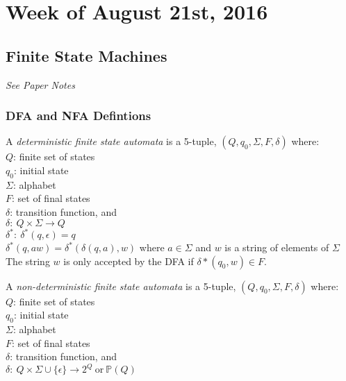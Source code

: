 \documentclass{article}
\begin{document}
\section{Week of August 21st, 2016}
\subsection{Finite State Machines}
\textit{See Paper Notes}

\subsubsection{DFA and NFA Defintions}
\begin{defn}
A \textit{deterministic finite state automata} is a 5-tuple, $(Q,q_0,\Sigma,F,\delta)$ where: \\
$Q$: finite set of states \\
$q_0$: initial state \\
$\Sigma$: alphabet \\
$F$: set of final states \\
$\delta$: transition function, and \\
$\delta:\ Q\times\Sigma\longrightarrow Q$ \\
$\delta^*:\ \delta^*(q,\epsilon)=q$ \\
$\delta^*(q,aw)=\delta^*(\delta(q,a),w)$ where $a\in\Sigma$ and $w$ is a string of elements of $\Sigma$ \\
The string $w$ is only accepted by the DFA if $\delta*(q_0,w)\in F$.
\end{defn}

\begin{defn}
A \textit{non-deterministic finite state automata} is a 5-tuple, $(Q,q_0,\Sigma,F,\delta)$ where: \\
$Q$: finite set of states \\
$q_0$: initial state \\
$\Sigma$: alphabet \\
$F$: set of final states \\
$\delta$: transition function, and \\
$\delta:\ Q\times\Sigma\cup\{\epsilon\}\longrightarrow 2^Q\ \text{or}\ \mathbb{P}(Q)$ \\
\end{defn}
\end{document}
